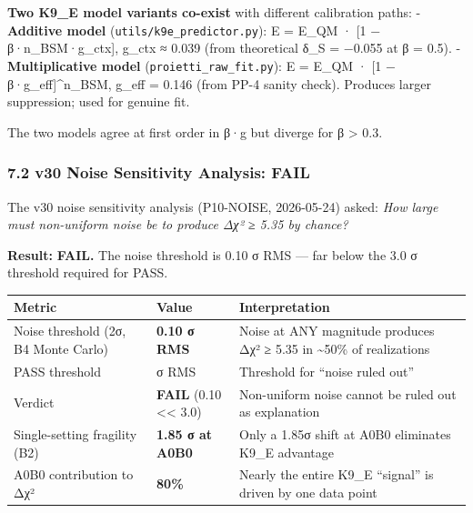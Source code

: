 \documentclass[
  11pt,
]{article}
\newcounter{none} %
\begin{document}
\textbf{Two K9\_E model variants co-exist} with different calibration
paths: - \textbf{Additive model} (\texttt{utils/k9e\_predictor.py}): E =
E\_QM · {[}1 − β·n\_BSM·g\_ctx{]}, g\_ctx ≈ 0.039 (from theoretical δ\_S
= −0.055 at β = 0.5). - \textbf{Multiplicative model}
(\texttt{proietti\_raw\_fit.py}): E = E\_QM · {[}1 −
β·g\_eff{]}\^{}n\_BSM, g\_eff = 0.146 (from PP-4 sanity check). Produces
larger suppression; used for genuine fit.

The two models agree at first order in β·g but diverge for β
\textgreater{} 0.3.

\subsubsection{7.2 v30 Noise Sensitivity Analysis:
FAIL}\label{v30-noise-sensitivity-analysis-fail}

The v30 noise sensitivity analysis (P10-NOISE, 2026-05-24) asked:
\emph{How large must non-uniform noise be to produce Δχ² ≥ 5.35 by
chance?}

\textbf{Result:} \textbf{FAIL.} The noise threshold is 0.10 σ RMS ---
far below the 3.0 σ threshold required for PASS.

{\def\LTcaptype{none} %
\begin{longtable}[]{@{}
  >{\raggedright\arraybackslash}p{}
  >{\raggedright\arraybackslash}p{}
  >{\raggedright\arraybackslash}p{}@{}}
\toprule\noalign{}
\begin{minipage}[b]{\linewidth}\raggedright
Metric
\end{minipage} & \begin{minipage}[b]{\linewidth}\raggedright
Value
\end{minipage} & \begin{minipage}[b]{\linewidth}\raggedright
Interpretation
\end{minipage} \\
\midrule\noalign{}
\endhead
\bottomrule\noalign{}
\endlastfoot
Noise threshold (2σ, B4 Monte Carlo) & \textbf{0.10 σ RMS} & Noise at
ANY magnitude produces Δχ² ≥ 5.35 in \textasciitilde50\% of
realizations \\
PASS threshold & 3.0 σ RMS & Threshold for ``noise ruled out'' \\
Verdict & \textbf{FAIL} (0.10 \textless\textless{} 3.0) & Non-uniform
noise cannot be ruled out as explanation \\
Single-setting fragility (B2) & \textbf{1.85 σ at A0B0} & Only a 1.85σ
shift at A0B0 eliminates K9\_E advantage \\
A0B0 contribution to Δχ² & \textbf{80\%} & Nearly the entire K9\_E
``signal'' is driven by one data point \\
\end{longtable}
}
\end{document}
